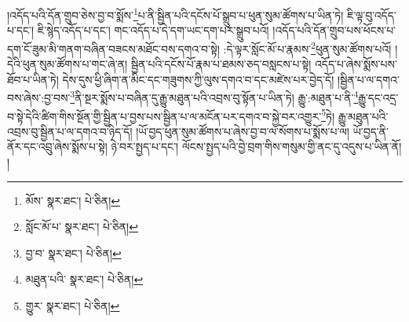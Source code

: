 །འདོད་པའི་དོན་གྲུབ་ཅེས་བྱ་བ་སྨོས་\footnote{མོས་  སྣར་ཐང་།  པེ་ཅིན། }པ་ནི་སྦྱིན་པའི་དངོས་པོ་སྒྲུབ་པ་ཕུན་སུམ་ཚོགས་པ་ཡིན་ཏེ། ཇི་ལྟ་བུ་འདོད་པ་དང་། ཇི་སྙེད་འདོད་པ་དང་། གང་འདོད་པ་དེ་དག་ཡང་དག་པར་སྒྲུབ་པའོ། །འདོད་པའི་དོན་གྲུབ་པས་ཕོངས་པ་དག་ངོ་ཟུམ་མི་གནག་བཞིན་བཟངས་མཐོང་བས་དགའ་བ་སྟེ། :དེ་ལྟར་སློང་མོ་པ་རྣམས་\footnote{སློང་མོ་པ་  སྣར་ཐང་།  པེ་ཅིན། }ཕུན་སུམ་ཚོགས་པའོ། །དེའི་ཕུན་སུམ་ཚོགས་པ་གང་ཞེ་ན། སྦྱིན་པའི་དངོས་པོ་རྣམ་པ་ཐམས་ཅད་བསླངས་པ་སྟེ། འདོད་པ་ཞེས་སྨོས་པས་ཐོབ་པ་ཡིན་ཏེ། དེས་དུས་ཕྱི་ཞིག་ན་མིང་དང་གཟུགས་ཀྱི་ལུས་དགའ་བ་དང་མཛེས་པར་བྱེད་དོ། །སྦྱིན་པ་ལ་དགའ་བས་ཞེས་:བྱ་བས་\footnote{བྱ་བ་  སྣར་ཐང་།  པེ་ཅིན། }ནི་སྔར་སྨོས་པ་བཞིན་དུ་རྒྱུ་མཐུན་པའི་འབྲས་བུ་སྟོན་པ་ཡིན་ཏེ། རྒྱུ་:མཐུན་པ་ནི་\footnote{མཐུན་པའི་  སྣར་ཐང་།  པེ་ཅིན། }རྒྱུ་དང་འདྲ་བ་སྟེ་དེའི་ཚིག་གིས་སྔོན་གྱི་སྦྱིན་པ་བྱས་པས་སྦྱིན་པ་ལ་མངོན་པར་དགའ་བ་སྐྱེ་བར་འགྱུར་\footnote{གྱུར་  སྣར་ཐང་།  པེ་ཅིན། }ཏེ། རྒྱུ་མཐུན་པའི་འབྲས་བུ་སྦྱིན་པ་ལ་དགའ་བ་ཉིད་དོ། །ཡོ་བྱད་ཕུན་སུམ་ཚོགས་པ་ཞེས་བྱ་བ་ལ་སོགས་པ་སྨོས་པ་ལ། ཡོ་བྱད་ནི་ནོར་དང་འབྲུ་ཞེས་སྨོས་པ་སྟེ། ཉེ་བར་སྤྱད་པ་དང་། ལོངས་སྤྱད་པའི་བྱེ་བྲག་གིས་གསུམ་གྱི་ནང་དུ་འདུས་པ་ཡིན་ནོ། །
